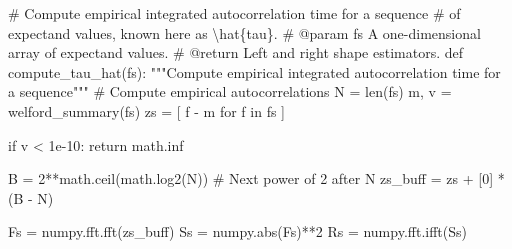 \documentclass[
  letterpaper,
  DIV=11,
  numbers=noendperiod]{scrartcl}
\newenvironment{Shaded}{\begin{snugshade}}{\end{snugshade}}
\newcommand{\BuiltInTok}[1]{\textcolor[rgb]{0.00,0.23,0.31}{#1}}
\newcommand{\CommentTok}[1]{\textcolor[rgb]{0.37,0.37,0.37}{#1}}
\newcommand{\ControlFlowTok}[1]{\textcolor[rgb]{0.00,0.23,0.31}{#1}}
\newcommand{\DecValTok}[1]{\textcolor[rgb]{0.68,0.00,0.00}{#1}}
\newcommand{\FloatTok}[1]{\textcolor[rgb]{0.68,0.00,0.00}{#1}}
\newcommand{\KeywordTok}[1]{\textcolor[rgb]{0.00,0.23,0.31}{#1}}
\newcommand{\NormalTok}[1]{\textcolor[rgb]{0.00,0.23,0.31}{#1}}
\newcommand{\OperatorTok}[1]{\textcolor[rgb]{0.37,0.37,0.37}{#1}}
\begin{document}
\begin{Shaded}
\begin{Highlighting}[]
\CommentTok{\# Compute empirical integrated autocorrelation time for a sequence}
\CommentTok{\# of expectand values, known here as \textbackslash{}hat\{tau\}.}
\CommentTok{\# @param fs A one{-}dimensional array of expectand values.}
\CommentTok{\# @return Left and right shape estimators.}
\KeywordTok{def}\NormalTok{ compute\_tau\_hat(fs):}
  \CommentTok{"""Compute empirical integrated autocorrelation time for a sequence"""}
  \CommentTok{\# Compute empirical autocorrelations}
\NormalTok{  N }\OperatorTok{=} \BuiltInTok{len}\NormalTok{(fs)}
\NormalTok{  m, v }\OperatorTok{=}\NormalTok{ welford\_summary(fs)}
\NormalTok{  zs }\OperatorTok{=}\NormalTok{ [ f }\OperatorTok{{-}}\NormalTok{ m }\ControlFlowTok{for}\NormalTok{ f }\KeywordTok{in}\NormalTok{ fs ]}
  
  \ControlFlowTok{if}\NormalTok{ v }\OperatorTok{\textless{}} \FloatTok{1e{-}10}\NormalTok{:}
    \ControlFlowTok{return}\NormalTok{ math.inf}
  
\NormalTok{  B }\OperatorTok{=} \DecValTok{2}\OperatorTok{**}\NormalTok{math.ceil(math.log2(N)) }\CommentTok{\# Next power of 2 after N}
\NormalTok{  zs\_buff }\OperatorTok{=}\NormalTok{ zs }\OperatorTok{+}\NormalTok{ [}\DecValTok{0}\NormalTok{] }\OperatorTok{*}\NormalTok{ (B }\OperatorTok{{-}}\NormalTok{ N)}
  
\NormalTok{  Fs }\OperatorTok{=}\NormalTok{ numpy.fft.fft(zs\_buff)}
\NormalTok{  Ss }\OperatorTok{=}\NormalTok{ numpy.}\BuiltInTok{abs}\NormalTok{(Fs)}\OperatorTok{**}\DecValTok{2}
\NormalTok{  Rs }\OperatorTok{=}\NormalTok{ numpy.fft.ifft(Ss)}
\end{Highlighting}
\end{Shaded}
\end{document}
